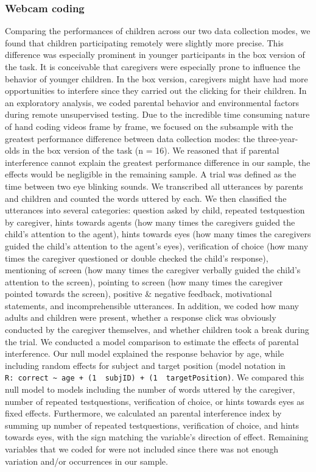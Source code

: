 \documentclass[
  man,floatsintext]{apa6}
\begin{document}
\hypertarget{webcam-coding}{%
\subsubsection{Webcam coding}\label{webcam-coding}}

Comparing the performances of children across our two data collection modes, we found that children participating remotely were slightly more precise. This difference was especially prominent in younger participants in the box version of the task. It is conceivable that caregivers were especially prone to influence the behavior of younger children. In the box version, caregivers might have had more opportunities to interfere since they carried out the clicking for their children.
In an exploratory analysis, we coded parental behavior and environmental factors during remote unsupervised testing. Due to the incredible time consuming nature of hand coding videos frame by frame, we focused on the subsample with the greatest performance difference between data collection modes: the three-year-olds in the box version of the task (n = 16). We reasoned that if parental interference cannot explain the greatest performance difference in our sample, the effects would be negligible in the remaining sample.
A trial was defined as the time between two eye blinking sounds. We transcribed all utterances by parents and children and counted the words uttered by each. We then classified the utterances into several categories: question asked by child, repeated testquestion by caregiver, hints towards agents (how many times the caregivers guided the child's attention to the agent), hints towards eyes (how many times the caregivers guided the child's attention to the agent's eyes), verification of choice (how many times the caregiver questioned or double checked the child's response), mentioning of screen (how many times the caregiver verbally guided the child's attention to the screen), pointing to screen (how many times the caregiver pointed towards the screen), positive \& negative feedback, motivational statements, and incomprehensible utterances.
In addition, we coded how many adults and children were present, whether a response click was obviously conducted by the caregiver themselves, and whether children took a break during the trial.
We conducted a model comparison to estimate the effects of parental interference. Our null model explained the response behavior by age, while including random effects for subject and target position (model notation in \texttt{R:\ correct\ \textasciitilde{}\ age\ +\ (1\ \textbar{}\ subjID)\ +\ (1\ \textbar{}\ targetPosition)}. We compared this null model to models including the number of words uttered by the caregiver, number of repeated testquestions, verification of choice, or hints towards eyes as fixed effects. Furthermore, we calculated an parental interference index by summing up number of repeated testquestions, verification of choice, and hints towards eyes, with the sign matching the variable's direction of effect. Remaining variables that we coded for were not included since there was not enough variation and/or occurrences in our sample.
\end{document}
